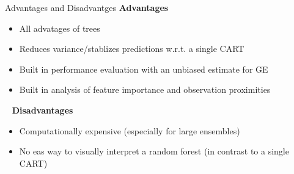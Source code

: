 \begin{vbframe}{Advantages and Disadvantges}
\textbf{Advantages}
\begin{itemize}
  \item All advatages of trees
  \item Reduces variance/stablizes predictions w.r.t. a single CART
  \item Built in performance evaluation with an unbiased estimate for GE
  \item Built in analysis of feature importance and observation proximities
\end{itemize}
\ \newline
\textbf{Disadvantages}
\begin{itemize}
  \item Computationally expensive (especially for large ensembles) 
  \item No eas way to visually interpret a random forest (in contrast to a single CART) 
\end{itemize}
\end{vbframe}

\endlecture

